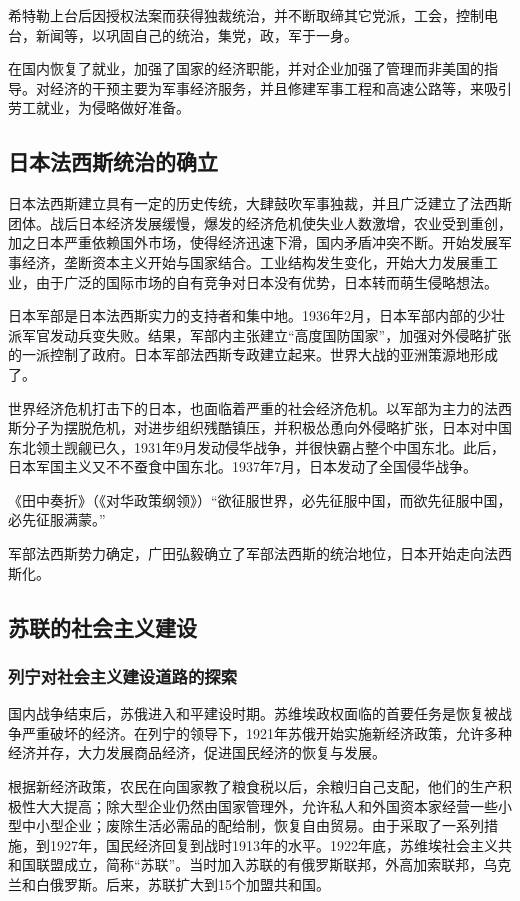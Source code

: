 希特勒上台后因授权法案而获得独裁统治，并不断取缔其它党派，工会，控制电台，新闻等，以巩固自己的统治，集党，政，军于一身。

在国内恢复了就业，加强了国家的经济职能，并对企业加强了管理而非美国的指导。对经济的干预主要为军事经济服务，并且修建军事工程和高速公路等，来吸引劳工就业，为侵略做好准备。

\subsection{日本法西斯统治的确立}
日本法西斯建立具有一定的历史传统，大肆鼓吹军事独裁，并且广泛建立了法西斯团体。战后日本经济发展缓慢，爆发的经济危机使失业人数激增，农业受到重创，加之日本严重依赖国外市场，使得经济迅速下滑，国内矛盾冲突不断。开始发展军事经济，垄断资本主义开始与国家结合。工业结构发生变化，开始大力发展重工业，由于广泛的国际市场的自有竞争对日本没有优势，日本转而萌生侵略想法。

日本军部是日本法西斯实力的支持者和集中地。1936年2月，日本军部内部的少壮派军官发动兵变失败。结果，军部内主张建立“高度国防国家”，加强对外侵略扩张的一派控制了政府。日本军部法西斯专政建立起来。世界大战的亚洲策源地形成了。

世界经济危机打击下的日本，也面临着严重的社会经济危机。以军部为主力的法西斯分子为摆脱危机，对进步组织残酷镇压，并积极怂恿向外侵略扩张，日本对中国东北领土觊觎已久，1931年9月发动侵华战争，并很快霸占整个中国东北。此后，日本军国主义又不不蚕食中国东北。1937年7月，日本发动了全国侵华战争。

《田中奏折》（《对华政策纲领》）“欲征服世界，必先征服中国，而欲先征服中国，必先征服满蒙。”

军部法西斯势力确定，广田弘毅确立了军部法西斯的统治地位，日本开始走向法西斯化。

\subsection{苏联的社会主义建设}

\subsubsection{列宁对社会主义建设道路的探索}
国内战争结束后，苏俄进入和平建设时期。苏维埃政权面临的首要任务是恢复被战争严重破坏的经济。在列宁的领导下，1921年苏俄开始实施新经济政策，允许多种经济并存，大力发展商品经济，促进国民经济的恢复与发展。

根据新经济政策，农民在向国家教了粮食税以后，余粮归自己支配，他们的生产积极性大大提高；除大型企业仍然由国家管理外，允许私人和外国资本家经营一些小型中小型企业；废除生活必需品的配给制，恢复自由贸易。由于采取了一系列措施，到1927年，国民经济回复到战时1913年的水平。1922年底，苏维埃社会主义共和国联盟成立，简称“苏联”。当时加入苏联的有俄罗斯联邦，外高加索联邦，乌克兰和白俄罗斯。后来，苏联扩大到15个加盟共和国。

